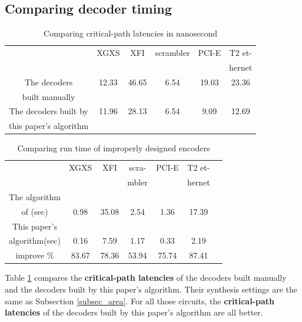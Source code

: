 \documentclass[journal]{IEEEtran}
\begin{document}
\subsection{Comparing decoder timing}\label{subsec_timing}

\begin{table}[b]
\centering
\caption{Comparing critical-path latencies in nanosecond}
\begin{tabular}{|c|c|c|c|c|c|}
\hline
                   &XGXS        &XFI       &scrambler    &PCI-E   &T2 et-\\
&&&&&hernet\\ \hline
The decoders       &12.33       &46.65     &6.54         &19.03  &23.36          \\
built manually           &&&&&\\ \hline
The decoders built by      &11.96       &28.13     &6.54         &9.09   &12.69          \\
this paper's algorithm   &&&&&\\ \hline
\end{tabular}\label{tab_cmptiming}
\end{table}

\begin{table}[t]
\centering
\caption{Comparing run time of improperly designed encoders}
\begin{tabular}{|c|c|c|c|c|c|c|}
\hline
                                        &XGXS     &XFI       &scra-     &PCI-E    &T2 et-\\
                                        &         &          &mbler     &        &hernet\\ \hline
The algorithm      &&&&&\\
of \cite{ShengYuShen:fmcad10}(sec)    &0.98     &35.08     &2.54      &1.36    &17.39\\\hline
This paper's                          &&&&&\\
algorithm(sec)                        &0.16     &7.59     &1.17      &0.33    &2.19\\\hline
improve \%                            &83.67    &78.36    &53.94     &75.74   &87.41\\\hline
\end{tabular}\label{tab_impdes}
\end{table}


Table \ref{tab_cmptiming} compares the \textbf{critical-path latencies} of the decoders built manually
and the decoders built by this paper's algorithm.
Their synthesis settings are the same as Subsection \ref{subsec_area}.
For all those circuits,
the \textbf{critical-path latencies} of the decoders built by this paper's algorithm are all better.
\end{document}
